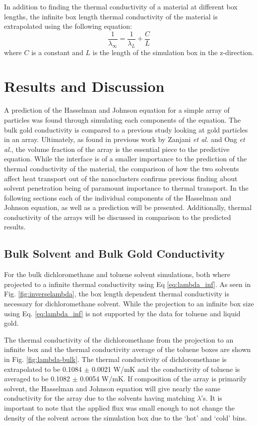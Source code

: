 In addition to finding the thermal conductivity of a material at different box lengths, the infinite box length thermal conductivity of the material is extrapolated using the following equation:
\begin{equation}
    \frac{1}{\lambda_{\infty}}= \frac{1}{\lambda_L} +\frac{C}{L}
    \label{eq:lambda_inf}
\end{equation}
where $C$ is a constant and $L$ is the length of the simulation box in the z-direction.\cite{Hannah2015} 

\section{Results and Discussion}
A prediction of the Hasselman and Johnson equation for a simple array of  particles was found through simulating each components of the equation.
The bulk gold conductivity is compared to a previous study looking at gold particles in an array. 
Ultimately, as found in previous work by Zanjani \textit{et al.}\cite{Zanjani2014} and Ong \textit{et al.}\cite{Ong:2014yq}, the volume fraction of the array is the essential piece to the predictive equation.
While the interface is of a smaller importance to the prediction of the thermal conductivity of the material, the comparison of how the two solvents affect heat transport out of the nanoclusters confirms previous finding about solvent penetration being of paramount importance to thermal transport.
In the following sections each of the individual components of the Hasselman and Johnson equation, as well as a prediction will be presented.
Additionally, thermal conductivity of the arrays will be discussed in comparison to the predicted results.

\subsection{Bulk Solvent and Bulk Gold Conductivity}
For the bulk dichloromethane and toluene solvent simulations, both where projected to a infinite thermal conductivity using Eq \ref{eq:lambda_inf}. 
As seen in Fig. \ref{fig:inverselambda}, the box length dependent thermal conductivity is necessary for dichloromethane solvent.
While the projection to an infinite box size using Eq. \ref{eq:lambda_inf} is not supported by the data for toluene and liquid gold.

The thermal conductivity of the dichloromethane from the projection to an infinite box and the thermal conductivity average of the toluene boxes are shown in Fig. \ref{fig:lambda-bulk}.
The thermal conductivity of dichloromethane is extrapolated to be 0.1084 $\pm$ 0.0021 W/mK and the conductivity of toluene is averaged to be 0.1082 $\pm$ 0.0054 W/mK.
If composition of the array is primarily solvent, the Hasselman and Johnson equation will give nearly the same conductivity for the array due to the solvents having matching $
\lambda$'s.
It is important to note that the applied flux was small enough to not change the density of the solvent across the simulation box due to the `hot' and `cold' bins.

